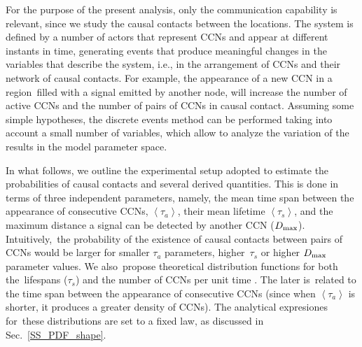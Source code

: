 \documentclass[crop]{CSLB}
\newcommand{\ceti}{CCN}
\newcommand{\cetis}{CCNs}
\begin{document}
%
For the purpose of the present analysis, only the communication capability is relevant, since we study the causal contacts between the locations.
%
The system is defined by a number of actors that represent \cetis{} and appear at different instants in time, generating events that produce meaningful changes in the variables that describe the system, i.e., in the arrangement of \cetis{} and their network of causal contacts.
%
For example, the appearance of a new \ceti{} in a region filled with a signal emitted by another node, will increase the number of active \cetis{} and the number of pairs of \cetis{} in causal contact.
%
Assuming some simple hypotheses, the discrete events method can be performed taking into account a small number of variables, which allow to analyze the variation of the results in the model parameter space.



In what follows, we outline the experimental setup adopted to estimate the probabilities of causal contacts and several derived quantities.
%
This is done in terms of three independent parameters, namely, the
mean time span between the appearance of consecutive \cetis{},
$\left<\tau_a\right>$, their mean lifetime $\left<\tau_s\right>$, and
the maximum distance a signal can be detected by another \ceti{}
($D_{\rm max}$).
%
Intuitively, the probability of the existence of causal contacts
between pairs of \cetis{} would be larger for smaller $\tau_a$
parameters, higher $\tau_s$ or higher $D_{\rm max}$ parameter values.
%
We also propose theoretical distribution functions for both the lifespans ($\tau_s$) and the number of \cetis{} per unit time \citep{maccone_evolution_2014, Sotos_biotechnology_2019}.
%
The later is related to the time span between the appearance of consecutive \cetis{} (since when $\left<\tau_a\right>$ is shorter, it produces a greater density of \cetis{}).
%
The analytical expresiones for these distributions are set to a fixed law, as discussed in Sec.~\ref{SS_PDF_shape}.  
    
     
\end{document}
